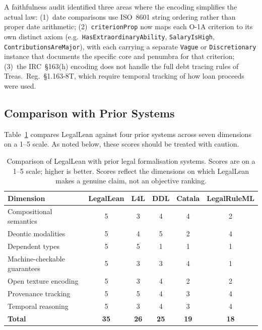 \documentclass[runningheads]{llncs}
\begin{document}
A faithfulness audit identified three areas where the encoding simplifies the
actual law: (1)~date comparisons use ISO~8601 string ordering rather than proper
date arithmetic; (2)~\texttt{criterionProp} now maps each O-1A criterion to its
own distinct axiom (e.g.\ \texttt{HasExtraordinaryAbility},
\texttt{SalaryIsHigh}, \texttt{ContributionsAreMajor}), with each carrying a
separate \texttt{Vague} or \texttt{Discretionary} instance that documents the
specific core and penumbra for that criterion; (3)~the IRC~\S163(h) encoding
does not handle the full debt tracing rules of Treas.~Reg.~\S1.163-8T, which
require temporal tracking of how loan proceeds were used.

\subsection{Comparison with Prior Systems}

Table~\ref{tab:comparison} compares LegalLean against four prior systems across
seven dimensions on a 1--5 scale. As noted below, these scores should be treated
with caution.

\begin{table}[t]
\caption{Comparison of LegalLean with prior legal formalisation systems.
Scores are on a 1--5 scale; higher is better. Scores reflect the dimensions on
which LegalLean makes a genuine claim, not an objective ranking.}
\label{tab:comparison}
\begin{tabular}{lccccc}
\hline
\textbf{Dimension} & \textbf{LegalLean} & \textbf{L4L} & \textbf{DDL} &
  \textbf{Catala} & \textbf{LegalRuleML} \\
\hline
Compositional semantics         & 5 & 3 & 4 & 4 & 2 \\
Deontic modalities              & 5 & 4 & 5 & 2 & 4 \\
Dependent types                 & 5 & 5 & 1 & 1 & 1 \\
Machine-checkable guarantees    & 5 & 3 & 3 & 4 & 1 \\
Open texture encoding           & 5 & 3 & 4 & 2 & 2 \\
Provenance tracking             & 5 & 5 & 4 & 3 & 4 \\
Temporal reasoning              & 5 & 3 & 4 & 3 & 4 \\
\hline
\textbf{Total}                  & \textbf{35} & \textbf{26} & \textbf{25} &
  \textbf{19} & \textbf{18} \\
\hline
\end{tabular}
\end{table}
\end{document}
